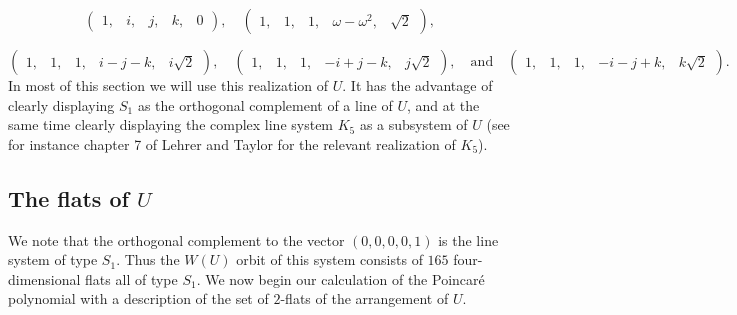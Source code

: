 \documentclass[11pt, reqno]{amsart}
\numberwithin{equation}{section}
\theoremstyle{definition}
\theoremstyle{plain}
\begin{document}
 $$\left( \begin{matrix} 1, & i, & j, & k, & 0 \end{matrix} \right), \quad \left( \begin{matrix} 1, & 1, & 1, & \omega-\omega^2, & \sqrt{2} \end{matrix} \right),$$
 
 $$\left( \begin{matrix} 1, & 1, & 1, & i-j-k, & i \sqrt{2} \end{matrix} \right), \quad \left( \begin{matrix} 1, & 1, & 1, & -i+j-k, & j \sqrt{2} \end{matrix} \right), \quad \text{and} \quad \left( \begin{matrix} 1, & 1, & 1, & -i-j+k, & k \sqrt{2} \end{matrix} \right). $$ In most of this section we will use this realization of $U$. It has the advantage of clearly displaying $S_1$ as the orthogonal complement of a line of $U$, and at the same time clearly displaying the complex line system $K_5$ as a subsystem of $U$ (see for instance chapter 7 of Lehrer and Taylor \cite{LeTa} for the relevant realization of $K_5$). 
 
 
 \subsection{The flats of $U$} We note that the orthogonal complement to the vector $(0,0,0,0,1)$ is the line system of type $S_1$. Thus the $W(U)$ orbit of this system consists of $165$ four-dimensional flats all of type $S_1$. We now begin our calculation of the Poincar\'e polynomial with a description of the set of $2$-flats of the arrangement of $U$.
 
\end{document}
